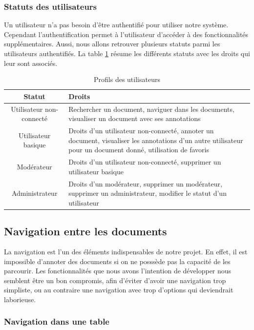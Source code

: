 \documentclass[a4paper]{article}
\begin{document}
\subsubsection{Statuts des utilisateurs}

Un utilisateur n'a pas besoin d'être authentifié pour utiliser notre système. Cependant l'authentification permet à l'utilisateur d'accéder à des fonctionnalités supplémentaires. Aussi, nous allons retrouver plusieurs statuts parmi les utilisateurs authentifiés. La table \ref{tab:profils} résume les différents statuts avec les droits qui leur sont associés. 

\begin{table}[H]
	\centering
		\small
			\begin{tabular}{|c|p{7cm}|}
				\hline
					\rowcolor{lightgray}\textbf{Statut} & \textbf{Droits} \\
				\hline
					Utilisateur non-connecté & Rechercher un document, naviguer dans les documents, visualiser un document avec ses annotations \\
				\hline
					Utilisateur basique & Droits d'un utilisateur non-connecté, annoter un document, visualiser les annotations d'un autre utilisateur pour un document donné, utilisation de favoris \\
				\hline
					Modérateur & Droits d'un utilisateur non-connecté, supprimer un utilisateur basique\\
				\hline
					Administrateur & Droits d'un modérateur, supprimer un modérateur, supprimer un administrateur, modifier le statut d'un utilisateur \\
				\hline
			\end{tabular}
			\caption{Profils des utilisateurs}
		\normalsize
	\label{tab:profils}
\end{table}


\subsection{Navigation entre les documents}

La navigation est l'un des éléments indispensables de notre projet. En effet, il est impossible d'annoter des documents si on ne posssède pas la capacité de les parcourir. Les fonctionnalités que nous avons l'intention de développer nous semblent être un bon compromis, afin d'éviter d'avoir une navigation trop simpliste, ou au contraire une navigation avec trop d'options qui deviendrait laborieuse. 

\subsubsection{Navigation dans une table}
\end{document}
